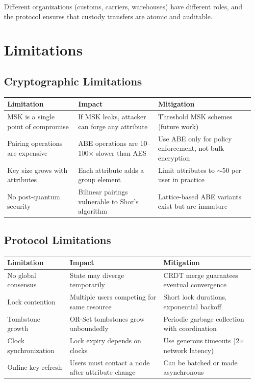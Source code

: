 \documentclass[sigconf,nonacm]{acmart}
\begin{document}
Different organizations (customs, carriers, warehouses) have different roles, and the protocol ensures that custody transfers are atomic and auditable.

\section{Limitations}

\subsection{Cryptographic Limitations}

\vspace{4pt}
\begin{tabularx}{\columnwidth}{l>{\hsize=0.8\hsize}X>{\hsize=1.2\hsize}X}
\toprule
\textbf{Limitation} & \textbf{Impact} & \textbf{Mitigation} \\
\midrule
MSK is a single point of compromise & If MSK leaks, attacker can forge any attribute & Threshold MSK schemes (future work) \\
Pairing operations are expensive & ABE operations are 10--100$\times$ slower than AES & Use ABE only for policy enforcement, not bulk encryption \\
Key size grows with attributes & Each attribute adds a group element & Limit attributes to $\sim$50 per user in practice \\
No post-quantum security & Bilinear pairings vulnerable to Shor's algorithm & Lattice-based ABE variants exist but are immature \\
\bottomrule
\end{tabularx}

\subsection{Protocol Limitations}

\vspace{4pt}
\begin{tabularx}{\columnwidth}{l>{\hsize=0.8\hsize}X>{\hsize=1.2\hsize}X}
\toprule
\textbf{Limitation} & \textbf{Impact} & \textbf{Mitigation} \\
\midrule
No global consensus & State may diverge temporarily & CRDT merge guarantees eventual convergence \\
Lock contention & Multiple users competing for same resource & Short lock durations, exponential backoff \\
Tombstone growth & OR-Set tombstones grow unboundedly & Periodic garbage collection with coordination \\
Clock synchronization & Lock expiry depends on clocks & Use generous timeouts (2$\times$ network latency) \\
Online key refresh & Users must contact a node after attribute change & Can be batched or made asynchronous \\
\bottomrule
\end{tabularx}
\end{document}
